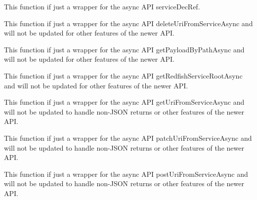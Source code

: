 
\begin{DoxyRefList}
\item[\label{deprecated__deprecated000007}%
\Hypertarget{deprecated__deprecated000007}%
Member \hyperlink{redfishService_8h_a01b64b10e6e2621b3428f87081560d96}{cleanup\+Service\+Enumerator} (redfish\+Service $\ast$service)]This function if just a wrapper for the async A\+PI service\+Dec\+Ref.  
\item[\label{deprecated__deprecated000004}%
\Hypertarget{deprecated__deprecated000004}%
Member \hyperlink{redfishService_8h_a26546fa9362698aadb5e0af0e58125a8}{delete\+Uri\+From\+Service} (redfish\+Service $\ast$service, const char $\ast$uri)]This function if just a wrapper for the async A\+PI delete\+Uri\+From\+Service\+Async and will not be updated for other features of the newer A\+PI.  
\item[\label{deprecated__deprecated000006}%
\Hypertarget{deprecated__deprecated000006}%
Member \hyperlink{redfishService_8h_a653ccf567fbb3bc032ad5d7763ccdafb}{get\+Payload\+By\+Path} (redfish\+Service $\ast$service, const char $\ast$path)]This function if just a wrapper for the async A\+PI get\+Payload\+By\+Path\+Async and will not be updated for other features of the newer A\+PI.  
\item[\label{deprecated__deprecated000005}%
\Hypertarget{deprecated__deprecated000005}%
Member \hyperlink{redfishService_8h_a0b2e6b5ba996617292c2c217fa3df987}{get\+Redfish\+Service\+Root} (redfish\+Service $\ast$service, const char $\ast$version)]This function if just a wrapper for the async A\+PI get\+Redfish\+Service\+Root\+Async and will not be updated for other features of the newer A\+PI.  
\item[\label{deprecated__deprecated000001}%
\Hypertarget{deprecated__deprecated000001}%
Member \hyperlink{redfishService_8h_ad5a421ce6f6dd733cf992ba2e545f813}{get\+Uri\+From\+Service} (redfish\+Service $\ast$service, const char $\ast$uri)]This function if just a wrapper for the async A\+PI get\+Uri\+From\+Service\+Async and will not be updated to handle non-\/\+J\+S\+ON returns or other features of the newer A\+PI.  
\item[\label{deprecated__deprecated000002}%
\Hypertarget{deprecated__deprecated000002}%
Member \hyperlink{redfishService_8h_a7598224d867cc9fa64decfc676044982}{patch\+Uri\+From\+Service} (redfish\+Service $\ast$service, const char $\ast$uri, const char $\ast$content)]This function if just a wrapper for the async A\+PI patch\+Uri\+From\+Service\+Async and will not be updated to handle non-\/\+J\+S\+ON returns or other features of the newer A\+PI.  
\item[\label{deprecated__deprecated000003}%
\Hypertarget{deprecated__deprecated000003}%
Member \hyperlink{redfishService_8h_a0263a582ab99f28f59030f9d2efbb170}{post\+Uri\+From\+Service} (redfish\+Service $\ast$service, const char $\ast$uri, const char $\ast$content, size\+\_\+t content\+Length, const char $\ast$content\+Type)]This function if just a wrapper for the async A\+PI post\+Uri\+From\+Service\+Async and will not be updated to handle non-\/\+J\+S\+ON returns or other features of the newer A\+PI. 
\end{DoxyRefList}